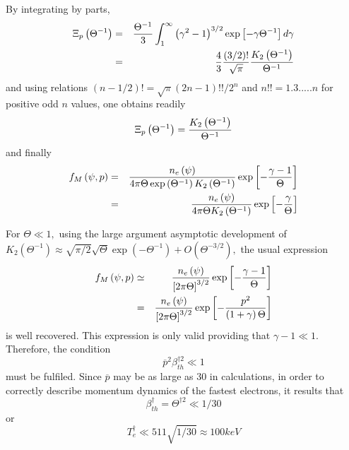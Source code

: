 By integrating by parts, 
\begin{eqnarray}
\Xi _{p}\left( \Theta ^{-1}\right) &=&\frac{\Theta ^{-1}}{3}\int_{1}^{\infty
}\left( \gamma ^{2}-1\right) ^{3/2}\exp \left[ -\gamma \Theta ^{-1}\right]
d\gamma  \notag \\
&=&\frac{4}{3}\frac{\left( 3/2\right) !}{\sqrt{\pi }}\frac{K_{2}\left(
\Theta ^{-1}\right) }{\Theta ^{-1}}
\end{eqnarray}
and using relations $\left( n-1/2\right) !=\sqrt{\pi }\left( 2n-1\right)
!!/2^{n}$ and $n!!=1.3.....n$ for positive odd $n$ values, one obtains
readily 
\begin{equation}
\Xi _{p}\left( \Theta ^{-1}\right) =\frac{K_{2}\left( \Theta ^{-1}\right) }{%
\Theta ^{-1}}
\end{equation}
and finally 
\begin{eqnarray}
f_{M}\left( \psi ,p\right) &=&\frac{n_{e}\left( \psi \right) }{4\pi \Theta
\exp \left( \Theta ^{-1}\right) K_{2}\left( \Theta ^{-1}\right) }\exp \left[
-\frac{\gamma -1}{\Theta }\right]  \notag \\
&=&\frac{n_{e}\left( \psi \right) }{4\pi \Theta K_{2}\left( \Theta
^{-1}\right) }\exp \left[ -\frac{\gamma }{\Theta }\right]
\end{eqnarray}

For $\Theta \ll 1,$ using the large argument asymptotic development of $%
K_{2}\left( \Theta ^{-1}\right) \approx \sqrt{\pi /2}\sqrt{\Theta }\exp
(-\Theta ^{-1})+O\left( \Theta ^{-3/2}\right) ,$ the usual expression 
\begin{eqnarray}
f_{M}\left( \psi ,p\right) &\simeq &\frac{n_{e}\left( \psi \right) }{\left[
2\pi \Theta \right] ^{3/2}}\exp \left[ -\frac{\gamma -1}{\Theta }\right] 
\notag \\
&=&\frac{n_{e}\left( \psi \right) }{\left[ 2\pi \Theta \right] ^{3/2}}\exp %
\left[ -\frac{p^{2}}{\left( 1+\gamma \right) \Theta }\right]
\end{eqnarray}
is well recovered. This expression is only valid providing that $\gamma
-1\ll 1.$ Therefore, the condition 
\begin{equation}
\overline{p}^{2}\beta _{th}^{\dag 2}\ll 1  \label{weakrelativist}
\end{equation}
must be fulfiled. Since $\overline{p}$ may be as large as $30$ in
calculations, in order to correctly describe momentum dynamics of the
fastest electrons, it results that 
\begin{equation}
\beta _{th}^{\dag }=\Theta ^{\dag 2}\ll 1/30
\end{equation}
or 
\begin{equation}
T_{e}^{\dag }\ll 511\sqrt{1/30}\approx 100keV
\end{equation}

